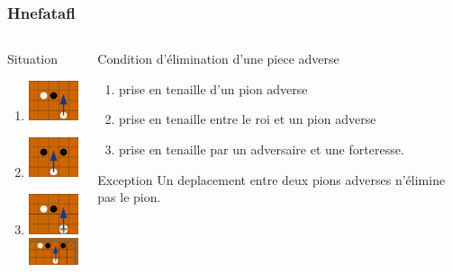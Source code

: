 \documentclass[11pt]{beamer}
\begin{document}
\begin{frame}

\frametitle{Hnefatafl}
\subtitle{Hnefatafl}
\begin{columns}[t]
\begin{column}{3cm}
	\begin{block}{Situation}
	\begin{enumerate}
		\item \centering \includegraphics[width=50pt]{images/cap1.png}
		\item \centering \includegraphics[width=50pt]{images/cap4.png}
		\item \centering \includegraphics[width=50pt]{images/cap2.png}
		\\
		 \centering \includegraphics[width=50pt]{images/cap3.png}
	\end{enumerate}	
	\end{block} 
\end{column}

\begin{column}{7cm}
	\begin{block}{Condition d'élimination d'une piece adverse}
		\begin{enumerate}
		\item prise en tenaille d'un pion adverse
		\item prise en tenaille entre le roi et un pion adverse
		\item prise en tenaille par un adversaire et une forteresse. 
		\end{enumerate}
	\end{block}  
	
	\begin{alertblock}{Exception}
Un deplacement entre deux pions adverses n'élimine pas le pion.
	\end{alertblock}  
\end{column}
\end{columns}  
\end{frame}
\end{document}
